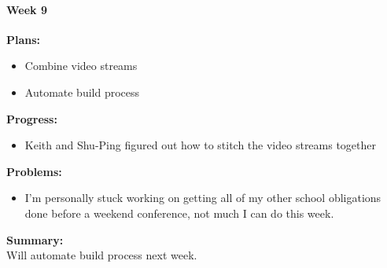 \paragraph{Week 9}
\begin{adjustwidth}{2.5em}{0pt}
    \vspace{-0.5cm}\textbf{Plans:}
    \vspace{-0.5cm}
    \begin{itemize}
        \item Combine video streams
        \item Automate build process
    \end{itemize} 
    \vspace{-0.3cm}\textbf{Progress:}
    \vspace{-0.5cm}
    \begin{itemize}
        \item  Keith and Shu-Ping figured out how to stitch the video streams together
    \end{itemize} 
    \vspace{-0.3cm}\textbf{Problems:}
    \vspace{-0.5cm}
    \begin{itemize}
        \item I'm personally stuck working on getting all of my other school obligations done before a weekend conference, not much I can do this week.
    \end{itemize}  
    \vspace{-0.3cm}\noindent\textbf{Summary:}\\
    \noindent 
    Will automate build process next week.
\end{adjustwidth} 

